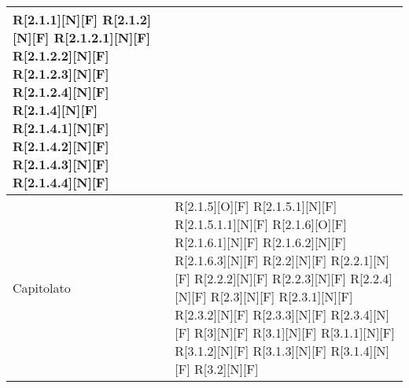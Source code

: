 \begin{longtable}{X | X}
		R[2.1.1][N][F]         \newline
		R[2.1.2][N][F]         \newline
		R[2.1.2.1][N][F]       \newline
		R[2.1.2.2][N][F]       \newline
		R[2.1.2.3][N][F]       \newline
		R[2.1.2.4][N][F]       \newline
		R[2.1.4][N][F]         \newline
		R[2.1.4.1][N][F]       \newline
		R[2.1.4.2][N][F]       \newline
		R[2.1.4.3][N][F]       \newline
		R[2.1.4.4][N][F]       \\ \hline
		Capitolato &
		R[2.1.5][O][F]         \newline
		R[2.1.5.1][N][F]       \newline
		R[2.1.5.1.1][N][F]	 \newline    
		R[2.1.6][O][F]         \newline
		R[2.1.6.1][N][F]       \newline
		R[2.1.6.2][N][F]       \newline
		R[2.1.6.3][N][F]       \newline
		R[2.2][N][F]           \newline
		R[2.2.1][N][F]         \newline
		R[2.2.2][N][F]         \newline
		R[2.2.3][N][F]         \newline
		R[2.2.4][N][F]         \newline
		R[2.3][N][F]           \newline
		R[2.3.1][N][F]         \newline
		R[2.3.2][N][F]         \newline
		R[2.3.3][N][F]         \newline
		R[2.3.4][N][F]         \newline
		R[3][N][F]             \newline
		R[3.1][N][F]	         \newline
		R[3.1.1][N][F]         \newline
		R[3.1.2][N][F]         \newline
		R[3.1.3][N][F]         \newline
		R[3.1.4][N][F]	     \newline
		R[3.2][N][F]           \newline

\end{longtable}
